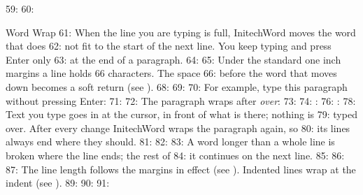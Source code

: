 59: 
60: \begin{Feature}{Word Wrap}
61: When the line you are typing is full, InitechWord moves the word that does
62: not fit to the start of the next line.  You keep typing and press Enter only
63: at the end of a paragraph.
64: 
65: Under the standard one inch margins a line holds 66 characters.  The space
66: before the word that moves down becomes a soft return (see ).
68: 
69: 
70: For example, type this paragraph without pressing Enter:
71: 
72: The paragraph wraps after \textit{over}:
73: 
74: : 
76: : 
78: Text you type goes in at the cursor, in front of what is there; nothing is
79: typed over.  After every change InitechWord wraps the paragraph again, so
80: its lines always end where they should.
81: 
82: 
83: A word longer than a whole line is broken where the line ends; the rest of
84: it continues on the next line.
85: 
86: 
87: The line length follows the margins in effect (see ).  Indented lines wrap at the indent (see ).
89: 
90: 
91: \end{Feature}
